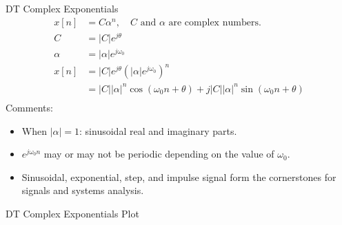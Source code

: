 \begin{frame}[plain]
    {
        {
            \centering
            
        }
    }
\end{frame}



\begin{frame}[plain]{DT Complex Exponentials}
    \begin{align}
        x[n] &= C\alpha^n, \quad C \text{ and } \alpha \text{ are complex numbers.}\\
        C &= |C|e^{j\theta}\\
        \alpha &= |\alpha|e^{j\omega_0}\\
        x[n] &= |C|e^{j\theta}\left(|\alpha|e^{j\omega_0}\right)^n\\
        &= |C||\alpha|^n\cos(\omega_0n + \theta) + j|C||\alpha|^n\sin(\omega_0n + \theta)\\
    \end{align}
    Comments:
    \begin{itemize}
      \item When $|\alpha| = 1$: sinusoidal real and imaginary parts.
      \item $e^{j\omega_0 n}$ may or may not be periodic depending on the value of $\omega_0$.
      \item Sinusoidal, exponential, step, and impulse signal form the cornerstones for signals and systems analysis.
    \end{itemize}
\end{frame}





\begin{frame}[plain]{DT Complex Exponentials Plot}
    {
        {
            \centering
            
        }
    }
\end{frame}




